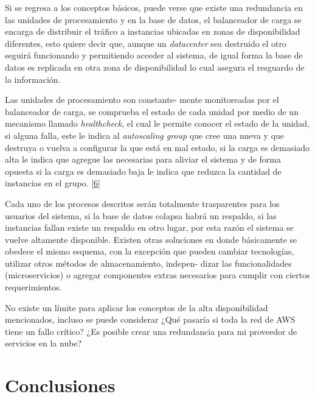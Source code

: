 \documentclass[12pt,spanish,Letterpaper,openany]{book}
\newcommand{\spacetwomilis}{\vspace{2mm}}
\newcommand{\spaceminusmilis}{\vspace{-0.5mm}}
\begin{document}
\spacetwomilis

Si se regresa a los conceptos básicos, puede verse que existe una redundancia en las unidades de procesamiento y en la base de datos, el balanceador de carga se encarga de distribuir el tráfico a instancias ubicadas en zonas de disponibilidad diferentes, esto quiere decir que, aunque un \emph{datacenter} sea destruido el otro seguirá funcionando y permitiendo acceder al sistema, de igual forma la base de datos es replicada en otra zona de disponibilidad lo cual asegura el resguardo de la información.

Las unidades de procesamiento son constante-
mente monitoreadas por el balanceador de carga, se comprueba el estado de cada unidad por medio de un mecanismo llamado \emph{healthcheck}, el cual le permite conocer el estado de la unidad, si alguna falla, este le indica al \emph{autoscaling group} que cree una nueva y que destruya o vuelva a configurar la que está en mal estado, si la carga es demasiado alta le indica que agregue las necesarias para aliviar el sistema y de forma opuesta si la carga es demasiado baja le indica que reduzca la cantidad de instancias en el grupo. \protect\hyperlink{articulo08_ref06}{{[}6{]}}

Cada uno de los procesos descritos serán totalmente trasparentes para los usuarios del sistema, si la base de datos colapsa habrá un respaldo, si las instancias fallan existe un respaldo en otro lugar, por esta razón el sistema se vuelve altamente disponible. Existen otras soluciones en donde básicamente se obedece el mismo esquema, con la excepción que pueden cambiar tecnologías, utilizar otros métodos de almacenamiento, indepen-
dizar las funcionalidades (microservicios) o agregar componentes extras necesarios para cumplir con ciertos requerimientos.

No existe un límite para aplicar los conceptos de la alta disponibilidad mencionados, incluso se puede considerar ¿Qué pasaría si toda la red de AWS tiene un fallo crítico? ¿Es posible crear una redundancia para mi proveedor de servicios en la nube?

\hypertarget{conclusiones-7}{%
\section*{Conclusiones}\label{conclusiones-7}}

\spaceminusmilis
\end{document}
